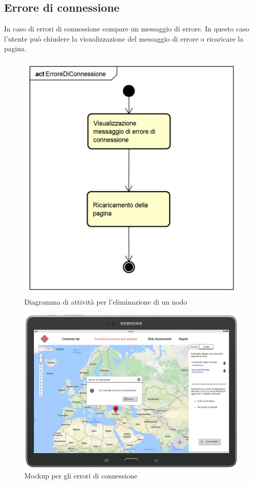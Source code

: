\subsection{Errore di connessione}
In caso di errori di connessione compare un messaggio di errore. In questo caso l'utente può chiudere la visualizzazione del messaggio di errore o ricaricare la pagina.
\begin{figure}[H]
	\centering
	\includegraphics[scale=0.7]{img/DiagrammiDiAttivita/ErroreDiConnessione.png}
	\caption{Diagramma di attività per l'eliminazione di un nodo}
\end{figure}
\begin{figure}[H]
	\centering
	\includegraphics[width=\textwidth]{img/MockUp/m9.png}
	\caption{Mockup per gli errori di connessione}
\end{figure}